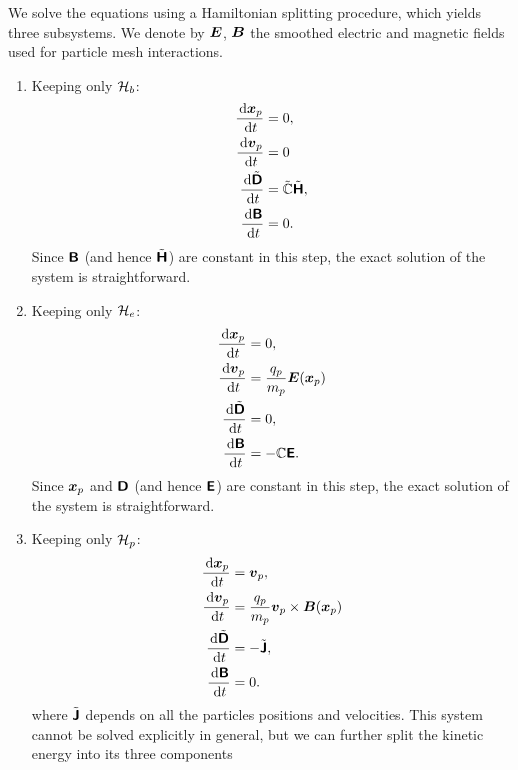 \documentclass[11pt]{article}
\begin{document}
We solve the equations using a Hamiltonian splitting procedure, which yields three subsystems. We denote by ${\boldsymbol E}$, ${\boldsymbol B}$ the smoothed electric and magnetic fields used for particle mesh interactions.
\begin{enumerate}
    \item Keeping only $\mathcal{H}_b$:
          $$
              \begin{aligned}
                  \frac{\, {\rm d} {\boldsymbol x}_p}{\, {\rm d} t}         & = 0,                                \\
                  \frac{\, {\rm d} {\boldsymbol v}_p }{\, {\rm d} t}        & = 0                                 \\
                  \frac{\, {\rm d} \tilde{{\boldsymbol {\rm \mathsf{D}}}}}{\, {\rm d} t} & =  \tilde{\mathbb{C}}\tilde{{\boldsymbol {\rm \mathsf{H}}}}, \\
                  \frac{\, {\rm d} {\boldsymbol {\rm \mathsf{B}}} }{\, {\rm d} t}        & = 0.
              \end{aligned}
          $$
          Since ${\boldsymbol {\rm \mathsf{B}}}$ (and hence $\tilde{{\boldsymbol {\rm \mathsf{H}}}}$) are constant in this step, the exact solution of the system is straightforward.
    \item Keeping only $\mathcal{H}_e$:
          $$
              \begin{aligned}
                  \frac{\, {\rm d} {\boldsymbol x}_p}{\, {\rm d} t}       & = 0,                          \\
                  \frac{\, {\rm d} {\boldsymbol v}_p }{\, {\rm d} t}      & = \frac {q_p}{m_p} {\boldsymbol E}({\boldsymbol x}_p) \\
                  \frac{\, {\rm d} \tilde{{\boldsymbol {\rm \mathsf{D}}}}}{\, {\rm d} t} & =  0,                         \\
                  \frac{\, {\rm d} {\boldsymbol {\rm \mathsf{B}}} }{\, {\rm d} t}      & = - \mathbb{C}{\boldsymbol {\rm \mathsf{E}}}.
              \end{aligned}
          $$
          Since ${\boldsymbol x}_p$ and ${\boldsymbol {\rm \mathsf{D}}}$ (and hence ${\boldsymbol {\rm \mathsf{E}}}$) are constant in this step, the exact solution of the system is straightforward.
    \item Keeping only $\mathcal{H}_p$:
          $$
              \begin{aligned}
                  \frac{\, {\rm d} {\boldsymbol x}_p}{\, {\rm d} t}         & = {\boldsymbol v}_p,                                 \\
                  \frac{\, {\rm d} {\boldsymbol v}_p }{\, {\rm d} t}        & = \frac {q_p}{m_p} {\boldsymbol v}_p\times{\boldsymbol B}({\boldsymbol x}_p) \\
                  \frac{\, {\rm d} \tilde{{\boldsymbol {\rm \mathsf{D}}}}}{\, {\rm d} t} & =  -\tilde{{\boldsymbol {\rm \mathsf{J}}}},                       \\
                  \frac{\, {\rm d} {\boldsymbol {\rm \mathsf{B}}} }{\, {\rm d} t}        & = 0.
              \end{aligned}
          $$
          where $\tilde{{\boldsymbol {\rm \mathsf{J}}}}$ depends on all the particles positions and velocities.
          This system cannot be solved explicitly in general, but we can further split the kinetic energy into its three components

\end{enumerate}
\end{document}
